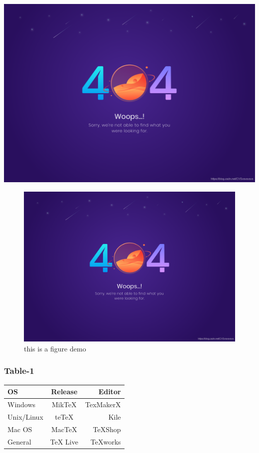 \documentclass[12pt]{mcmthesis}
\begin{document}

\includegraphics[scale=0.2]{404.png}  %


\begin{figure}[ht]   %
  \centering
  \includegraphics[scale=0.2]{404.png}
  \caption{this is a figure demo}
  \label{fig:label}
\end{figure}





\subsubsection{Table-1}
\begin{tabular}{|l|c|r|}
  \hline
  OS         & Release  & Editor    \\
  \hline
  Windows    & MikTeX   & TexMakerX \\
  \hline
  Unix/Linux & teTeX    & Kile      \\
  \hline
  Mac OS     & MacTeX   & TeXShop   \\
  \hline
  General    & TeX Live & TeXworks  \\
  \hline
\end{tabular}
\end{document}
